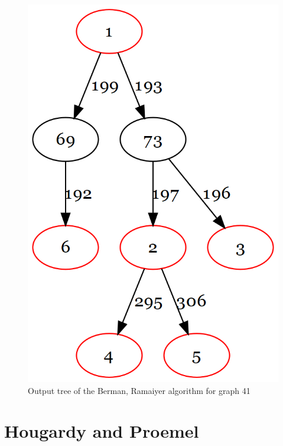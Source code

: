 \begin{figure}[htbp]
\centering
\includegraphics[scale=0.25]{figures/BermanRamaiyer.png}
\caption{Output tree of the Berman, Ramaiyer algorithm for graph 41}\label{fig:BeRaTree41}
\end{figure}

\section{Hougardy and Proemel}

